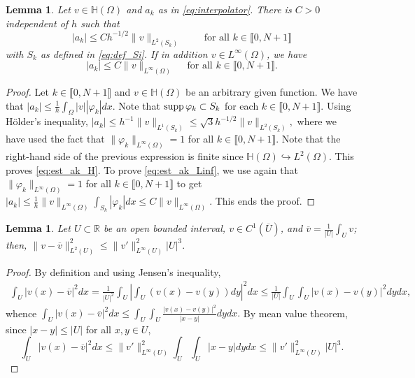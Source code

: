 \documentclass[11 pt]{article}
\newcommand\inter[1]{\llbracket #1\rrbracket}
\newtheorem{lemma}[theorem]{Lemma}
\numberwithin{equation}{section}
\def\R{\mathbb{R}}
\begin{document}
%
\begin{lemma}\label{lem:bounds_aks}
Let $v\in \mathbb H(\Omega)$ and $a_k$ as in \eqref{eq:interpolator}. There is $C>0$ independent of $h$ such that
%
\begin{equation}\label{eq:est_ak_H}
    |a_k|\leq C h^{-1/2} \|v\|_{L^2(S_k)}\qquad \text{ for all } k\in\inter{0,N+1}
\end{equation}
%
with $S_k$ as defined in \eqref{eq:def_Si}. If in addition $v\in L^\infty(\Omega)$, we have
\begin{equation}\label{eq:est_ak_Linf}
    |a_k|\leq C \|v\|_{L^\infty(\Omega)} \quad\text{ for all } k\in\inter{0,N+1}.
\end{equation}
\end{lemma}
%
\begin{proof}
Let $k\in\inter{0,N+1}$ and $v\in\mathbb H(\Omega)$ be an arbitrary given function. We have that $|a_k|\leq \frac{1}{h}\int_{\Omega}|v||\varphi_k|dx.$ Note that $\textnormal{supp}\,\varphi_k\subset S_k$ for each $k\in\inter{0,N+1}$. Using H\"older's inequality, $|a_k|\leq h^{-1}\|v\|_{L^1(S_k)}\leq \sqrt{3}h^{-1/2}\|v\|_{L^2(S_k)},$ where we have used the fact that $\|\varphi_k\|_{L^\infty(\Omega)}=1$ for all $k\in\inter{0,N+1}$. Note that the right-hand side of the previous expression is finite since $\mathbb H(\Omega)\hookrightarrow L^2(\Omega)$. This proves \eqref{eq:est_ak_H}. To prove \eqref{eq:est_ak_Linf}, we use again that $\|\varphi_k\|_{L^\infty(\Omega)}=1$ for all $k\in\inter{0,N+1}$ to get $|a_k|\leq \frac{1}{h}\|v\|_{L^\infty(\Omega)}\int_{S_k}|\varphi_k| dx \leq C\|v\|_{L^\infty(\Omega)}.$ This ends the proof.
\end{proof}

\begin{lemma}\label{lem:poincare_type}
Let $U\subset \R$ be an open bounded interval, $v\in C^1(\overline{U})$, and $\overline v=\frac{1}{|U|}\int_{U}v$; then, $
    \|v-\overline{v}\|_{L^2(U)}^2\leq \|v'\|^2_{L^\infty(U)}|U|^3.$
%
\end{lemma}
%
\begin{proof}
By definition and using Jensen's inequality,
%
\begin{align*}
    \int_{U}|v(x)-\overline{v}|^2dx=\frac{1}{|U|^2}\int_{U}\left|\int_{U}(v(x)-v(y))dy\right|^2dx \leq \frac{1}{|U|}\int_{U}\int_{U}|v(x)-v(y)|^2dy dx,
\end{align*}
%
whence $\int_{U}|v(x)-\overline{v}|^2dx \leq \int_{U}\int_{U}\frac{|v(x)-v(y)|^2}{|x-y|}dy dx.$ By mean value theorem, since $|x-y|\leq |U|$ for all $x,y\in U$,
%
\begin{equation*}
    \int_{U}|v(x)-\overline{v}|^2dx 
    \leq \|v'\|^2_{L^\infty(U)}\int_{U}\int_{U}|x-y|dy dx
    \leq \|v'\|^2_{L^\infty(U)}|U|^3.
\end{equation*}
\end{proof}
\end{document}
